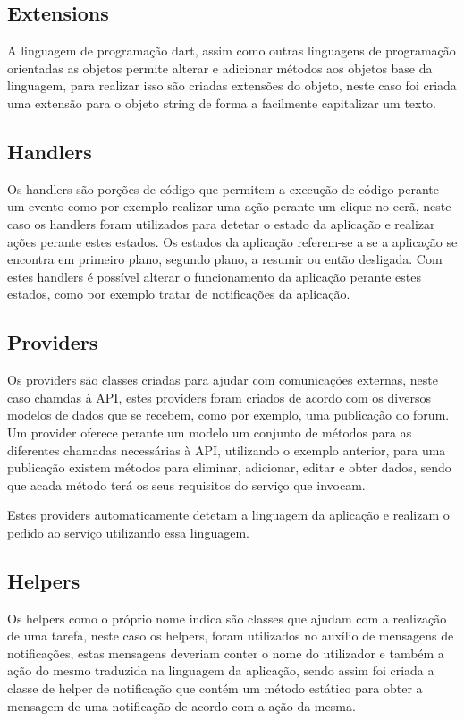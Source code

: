 \subsection{Extensions}
A linguagem de programação dart, assim como outras linguagens de programação orientadas as objetos permite alterar e adicionar métodos aos objetos base da linguagem, para realizar isso são criadas extensões do objeto, neste caso foi criada uma extensão para o objeto string de forma a facilmente capitalizar um texto.

\subsection{Handlers}
Os handlers são porções de código que permitem a execução de código perante um evento como por exemplo realizar uma ação perante um clique no ecrã, neste caso os handlers foram utilizados para detetar o estado da aplicação e realizar ações perante estes estados. Os estados da aplicação referem-se a se a aplicação se encontra em primeiro plano, segundo plano, a resumir ou então desligada. Com estes handlers é possível alterar o funcionamento da aplicação perante estes estados, como por exemplo tratar de notificações da aplicação.

\subsection{Providers}
Os providers são classes criadas para ajudar com comunicações externas, neste caso chamdas à API, estes providers foram criados de acordo com os diversos modelos de dados que se recebem, como por exemplo, uma publicação do forum. Um provider oferece perante um modelo um conjunto de métodos para as diferentes chamadas necessárias à API, utilizando o exemplo anterior, para uma publicação existem métodos para eliminar, adicionar, editar e obter dados, sendo que acada método terá os seus requisitos do serviço que invocam.

Estes providers automaticamente detetam a linguagem da aplicação e realizam o pedido ao serviço utilizando essa linguagem.

\subsection{Helpers}
Os helpers como o próprio nome indica são classes que ajudam com a realização de uma tarefa, neste caso os helpers, foram utilizados no auxílio de mensagens de notificações, estas mensagens deveriam conter o nome do utilizador e também a ação do mesmo traduzida na linguagem da aplicação, sendo assim foi criada a classe de helper de notificação que contém um método estático para obter a mensagem de uma notificação de acordo com a ação da mesma.
